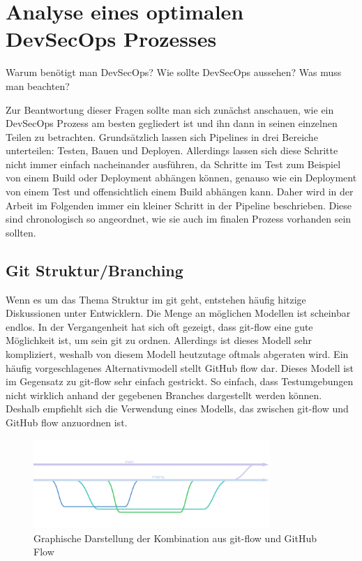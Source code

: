 \section{Analyse eines optimalen DevSecOps Prozesses}\label{sec:analysisDevSecOps}
Warum benötigt man DevSecOps?
Wie sollte DevSecOps aussehen?
Was muss man beachten?

Zur Beantwortung dieser Fragen sollte man sich zunächst anschauen, wie ein DevSecOps Prozess am besten gegliedert ist und ihn dann in seinen einzelnen Teilen zu betrachten.
Grundsätzlich lassen sich Pipelines in drei Bereiche unterteilen: Testen, Bauen und Deployen.
Allerdings lassen sich diese Schritte nicht immer einfach nacheinander ausführen, da Schritte im Test zum Beispiel von einem Build oder Deployment abhängen können, genauso wie ein Deployment von einem Test und offensichtlich einem Build abhängen kann.
Daher wird in der Arbeit im Folgenden immer ein kleiner Schritt in der Pipeline beschrieben.
Diese sind chronologisch so angeordnet, wie sie auch im finalen Prozess vorhanden sein sollten.

\subsection{Git Struktur/Branching}

Wenn es um das Thema Struktur im git geht, entstehen häufig hitzige Diskussionen unter Entwicklern.
Die Menge an möglichen Modellen ist scheinbar endlos.
In der Vergangenheit hat sich oft gezeigt, dass git-flow\cite{SuccessfulGitBranching} eine gute Möglichkeit ist, um sein git zu ordnen.
Allerdings ist dieses Modell sehr kompliziert, weshalb von diesem Modell heutzutage oftmals abgeraten wird.
Ein häufig vorgeschlagenes Alternativmodell stellt GitHub flow\cite{UnderstandingGitHubFlow} dar.
Dieses Modell ist im Gegensatz zu git-flow sehr einfach gestrickt.
So einfach, dass Testumgebungen nicht wirklich anhand der gegebenen Branches dargestellt werden können.
Deshalb empfiehlt sich die Verwendung eines Modells, das zwischen git-flow und GitHub flow anzuordnen ist.
\begin{figure}[H]
    \includegraphics[width=0.8\textwidth]{img/branching}
    \centering
    \caption{Graphische Darstellung der Kombination aus git-flow und GitHub Flow}
    \label{fig:branchingModel}
\end{figure}


